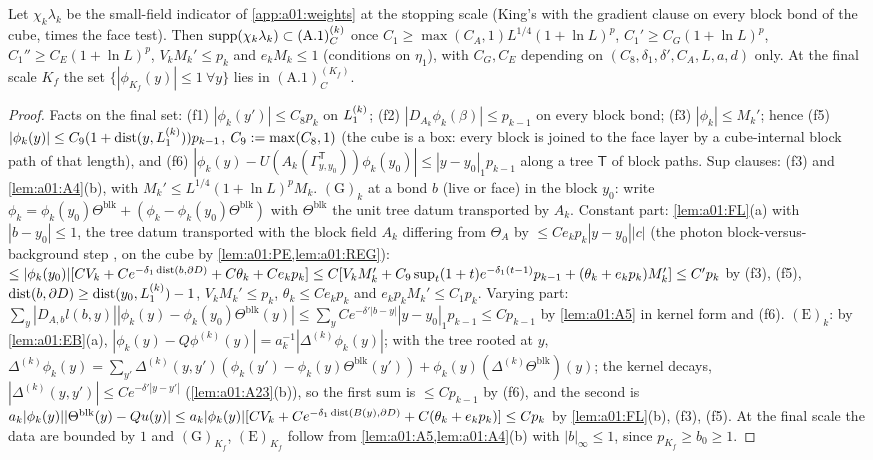 \begin{lemma}\label{lem:a01:final}
Let $\chi_k\lambda_k$ be the small-field indicator of \cref{app:a01:weights} at the stopping scale (King's \cite[(3.2)]{K1} with the gradient clause on every block bond of the cube, times the face test). Then $\operatorname{supp}(\chi_k\lambda_k)\subset(\mathrm{A.1})^{(k)}_C$ once $C_1\ge\max(C_A,1)L^{1/4}(1+\ln L)^p$, $C_1'\ge C_G(1+\ln L)^p$, $C_1''\ge C_E(1+\ln L)^p$, $V_kM_k'\le p_k$ and $e_kM_k\le1$ (conditions on $\eta_1$), with $C_G,C_E$ depending on $(C_8,\delta_1,\delta',C_A,L,a,d)$ only. At the final scale $K_f$ the set $\{|\phi_{K_f}(y)|\le1\ \forall y\}$ lies in $(\mathrm{A.1})^{(K_f)}_C$.
\end{lemma}
\begin{proof}
Facts on the final set: (f1) $|\phi_k(y')|\le C_8p_k$ on $L_{1}^{(k)}$; (f2) $|D_{A_k}\phi_k(\beta)|\le p_{k-1}$ on every block bond; (f3) $|\phi_k|\le M_k'$; hence (f5) $|\phi_k(y)|\le C_9(1+\operatorname{dist}(y,L_{1}^{(k)}))p_{k-1}$, $C_9:=\max(C_8,1)$ (the cube is a box: every block is joined to the face layer by a cube-internal block path of that length), and (f6) $|\phi_k(y)-U(A_k(\Gamma^{\mathsf T}_{y,y_0}))\phi_k(y_0)|\le|y-y_0|_1p_{k-1}$ along a tree $\mathsf T$ of block paths. Sup clauses: (f3) and \cref{lem:a01:A4}(b), with $M_k'\le L^{1/4}(1+\ln L)^pM_k$. $(\mathrm G)_k$ at a bond $b$ (live or face) in the block $y_0$: write $\phi_k=\phi_k(y_0)\Theta^{\mathrm{blk}}+(\phi_k-\phi_k(y_0)\Theta^{\mathrm{blk}})$ with $\Theta^{\mathrm{blk}}$ the unit tree datum transported by $A_k$. Constant part: \cref{lem:a01:FL}(a) with $|b-y_0|\le1$, the tree datum transported with the block field $A_k$ differing from $\Theta_A$ by $\le Ce_kp_k|y-y_0||c|$ (the photon block-versus-background step \cite[(A.2)--(A.6)]{K1}, on the cube by \cref{lem:a01:PE,lem:a01:REG}): $\le|\phi_k(y_0)|[CV_k+Ce^{-\delta_1\operatorname{dist}(b,\partial D)}+C\theta_k+Ce_kp_k]\le C[V_kM_k'+C_9\sup_t(1+t)e^{-\delta_1(t-1)}p_{k-1}+(\theta_k+e_kp_k)M_k']\le C'p_k$ by (f3), (f5), $\operatorname{dist}(b,\partial D)\ge\operatorname{dist}(y_0,L_{1}^{(k)})-1$, $V_kM_k'\le p_k$, $\theta_k\le Ce_kp_k$ and $e_kp_kM_k'\le C_1p_k$. Varying part: $\sum_y|D_{A,b}l(b,y)||\phi_k(y)-\phi_k(y_0)\Theta^{\mathrm{blk}}(y)|\le\sum_yCe^{-\delta'|b-y|}|y-y_0|_1p_{k-1}\le Cp_{k-1}$ by \cref{lem:a01:A5} in kernel form and (f6). $(\mathrm E)_k$: by \cref{lem:a01:EB}(a), $|\phi_k(y)-Q\phi^{(k)}(y)|=a_k^{-1}|\Delta^{(k)}\phi_k(y)|$; with the tree rooted at $y$, $\Delta^{(k)}\phi_k(y)=\sum_{y'}\Delta^{(k)}(y,y')(\phi_k(y')-\phi_k(y)\Theta^{\mathrm{blk}}(y'))+\phi_k(y)(\Delta^{(k)}\Theta^{\mathrm{blk}})(y)$; the kernel decays, $|\Delta^{(k)}(y,y')|\le Ce^{-\delta'|y-y'|}$ (\cref{lem:a01:A23}(b)), so the first sum is $\le Cp_{k-1}$ by (f6), and the second is $a_k|\phi_k(y)||\Theta^{\mathrm{blk}}(y)-Qu(y)|\le a_k|\phi_k(y)|[CV_k+Ce^{-\delta_1\operatorname{dist}(B(y),\partial D)}+C(\theta_k+e_kp_k)]\le Cp_k$ by \cref{lem:a01:FL}(b), (f3), (f5). At the final scale the data are bounded by $1$ and $(\mathrm G)_{K_f}$, $(\mathrm E)_{K_f}$ follow from \cref{lem:a01:A5,lem:a01:A4}(b) with $|b|_\infty\le1$, since $p_{K_f}\ge b_0\ge1$.
\end{proof}

